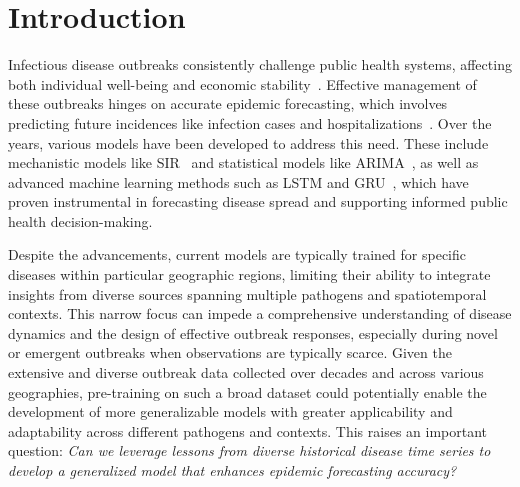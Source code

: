 \section{Introduction}
Infectious disease outbreaks consistently challenge public health systems, affecting both individual well-being and economic stability~\cite{nicola2020socio}. Effective management of these outbreaks hinges on accurate epidemic forecasting, which involves predicting future incidences like infection cases and hospitalizations~\cite{liu2024review, wan2024epidemiology, adhikari2019epideep}. Over the years, various models have been developed to address this need. These include mechanistic models like SIR~\cite{cooper2020sir} and statistical models like ARIMA~\cite{sahai2020arima, kontopoulou2023review}, as well as advanced machine learning methods such as LSTM and GRU~\cite{shahid2020predictions}, which have proven instrumental in forecasting disease spread and supporting informed public health decision-making.



Despite the advancements, current models are typically trained for specific diseases within particular geographic regions, limiting their ability to integrate insights from diverse sources spanning multiple pathogens and spatiotemporal contexts. This narrow focus can impede a comprehensive understanding of disease dynamics and the design of effective outbreak responses, especially during novel or emergent outbreaks when observations are typically scarce. Given the extensive and diverse outbreak data collected over decades and across various geographies, pre-training on such a broad dataset could potentially enable the development of more generalizable models with greater applicability and adaptability across different pathogens and contexts. This raises an important question:
\textit{Can we leverage lessons from diverse historical disease time series to develop a generalized model that enhances epidemic forecasting accuracy?}



